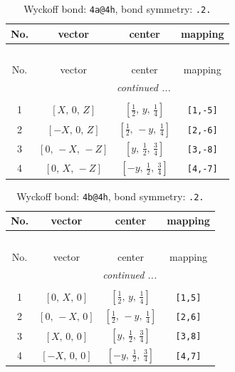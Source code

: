 \documentclass[fleqn,8pt]{jsarticle}
\begin{document}
\begin{longtable}{cccc}
\caption{Wyckoff bond: {\tt 4a@4h}, bond symmetry: {\tt .2.}}
 \\
 \hline \hline
No. & vector & center & mapping \\ \hline \endfirsthead

\multicolumn{3}{l}{\tablename\ \thetable{}} \\
 \hline \hline
No. & vector & center & mapping \\ \hline \endhead

 \hline \hline
\multicolumn{3}{r}{\footnotesize\it continued ...} \\ \endfoot

 \hline \hline
\multicolumn{3}{r}{} \\ \endlastfoot

1 & $\left[ X,\, 0,\, Z \right]$ & $\left[ \frac{1}{2},\, y,\, \frac{1}{4} \right]$ & {\tt [1,-5]} \\ \hline
2 & $\left[ - X,\, 0,\, Z \right]$ & $\left[ \frac{1}{2},\, - y,\, \frac{1}{4} \right]$ & {\tt [2,-6]} \\ \hline
3 & $\left[ 0,\, - X,\, - Z \right]$ & $\left[ y,\, \frac{1}{2},\, \frac{3}{4} \right]$ & {\tt [3,-8]} \\ \hline
4 & $\left[ 0,\, X,\, - Z \right]$ & $\left[ - y,\, \frac{1}{2},\, \frac{3}{4} \right]$ & {\tt [4,-7]} \\
\end{longtable}
\renewcommand{\arraystretch}{1.2}
\begin{longtable}{cccc}
\caption{Wyckoff bond: {\tt 4b@4h}, bond symmetry: {\tt .2.}}
 \\
 \hline \hline
No. & vector & center & mapping \\ \hline \endfirsthead

\multicolumn{3}{l}{\tablename\ \thetable{}} \\
 \hline \hline
No. & vector & center & mapping \\ \hline \endhead

 \hline \hline
\multicolumn{3}{r}{\footnotesize\it continued ...} \\ \endfoot

 \hline \hline
\multicolumn{3}{r}{} \\ \endlastfoot

1 & $\left[ 0,\, X,\, 0 \right]$ & $\left[ \frac{1}{2},\, y,\, \frac{1}{4} \right]$ & {\tt [1,5]} \\ \hline
2 & $\left[ 0,\, - X,\, 0 \right]$ & $\left[ \frac{1}{2},\, - y,\, \frac{1}{4} \right]$ & {\tt [2,6]} \\ \hline
3 & $\left[ X,\, 0,\, 0 \right]$ & $\left[ y,\, \frac{1}{2},\, \frac{3}{4} \right]$ & {\tt [3,8]} \\ \hline
4 & $\left[ - X,\, 0,\, 0 \right]$ & $\left[ - y,\, \frac{1}{2},\, \frac{3}{4} \right]$ & {\tt [4,7]} \\
\end{longtable}
\end{document}
